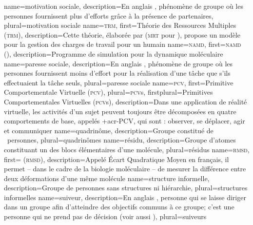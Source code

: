 %
{%
	name={motivation sociale},%
	description={En anglais  , phénomène de groupe où les personnes fournissent plus d'efforts grâce à la présence de partenaires},%
	plural={motivation sociale}%
}
%
{%
	name={\textsc{trm}},
	first={Théorie des Ressources Multiples (\textsc{trm})},%
	description={Cette théorie, élaborée par  (\textsc{mrt} pour ), propose un modèle pour la gestion des charges de travail pour un humain}
}
%
{%
	name={\textsc{namd}},%
	first={\textsc{namd} ()},%
	description={Programme de simulation pour la dynamique moléculaire }%
}
%
{%
	name={paresse sociale},%
	description={En anglais  , phénomène de groupe où les personnes fournissent moins d'effort pour la réalisation d'une tâche que s'ils effectuaient la tâche seuls},%
	plural={paresse sociale}%
}
%
{%
	name={\textsc{pcv}},
	first={Primitive Comportementale Virtuelle (\textsc{pcv})},%
	plural={\textsc{pcv}s},%
	firstplural={Primitives Comportementales Virtuelles (\textsc{pcv}s)},%
	description={Dans une application de réalité virtuelle, les activités d'un sujet peuvent toujours être décomposées en quatre comportements de base, appelés \myacro+{acr-PCV}, qui sont : observer, se déplacer, agir et communiquer }
}
%
{%
	name={quadrinôme},%
	description={Groupe constitué de ~personnes},%
	plural={quadrinômes}%
}
%
{%
	name={résidu},%
	description={Groupe d'atomes constituant un des blocs élémentaires d'une molécule},%
	plural={résidus}%
}
%
{%
	name={\textsc{rmsd}},%
	first={ (\textsc{rmsd})},%
	description={Appelé Écart Quadratique Moyen en français, il permet -- dans le cadre de la biologie moléculaire -- de mesurer la différence entre deux déformations d'une même molécule}%
}
%
{%
	name={structure informelle},%
	description={Groupe de personnes sans structures ni hiérarchie},%
	plural={structures informelles}%
}
%
{%
	name={suiveur},%
	description={En anglais , personne qui se laisse diriger dans un groupe afin d'atteindre des objectifs communs à ce groupe; c'est une personne qui ne prend pas de décision (voir aussi )},%
	plural={suiveurs}%
}
